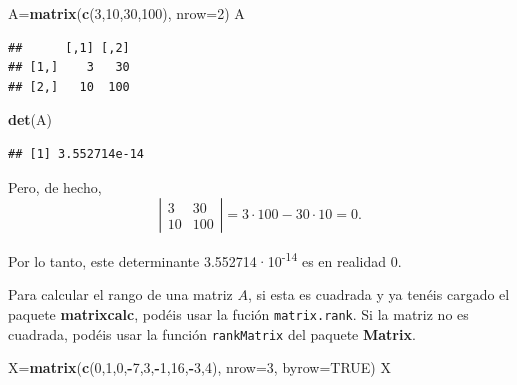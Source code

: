\documentclass[]{book}
\newenvironment{Shaded}{\begin{snugshade}}{\end{snugshade}}
\newcommand{\DataTypeTok}[1]{\textcolor[rgb]{0.13,0.29,0.53}{#1}}
\newcommand{\DecValTok}[1]{\textcolor[rgb]{0.00,0.00,0.81}{#1}}
\newcommand{\KeywordTok}[1]{\textcolor[rgb]{0.13,0.29,0.53}{\textbf{#1}}}
\newcommand{\NormalTok}[1]{#1}
\newcommand{\OperatorTok}[1]{\textcolor[rgb]{0.81,0.36,0.00}{\textbf{#1}}}
\newcommand{\OtherTok}[1]{\textcolor[rgb]{0.56,0.35,0.01}{#1}}
\theoremstyle{definition}
\theoremstyle{definition}
\theoremstyle{definition}
\theoremstyle{remark}
\begin{document}
\begin{Shaded}
\begin{Highlighting}[]
\NormalTok{A=}\KeywordTok{matrix}\NormalTok{(}\KeywordTok{c}\NormalTok{(}\DecValTok{3}\NormalTok{,}\DecValTok{10}\NormalTok{,}\DecValTok{30}\NormalTok{,}\DecValTok{100}\NormalTok{), }\DataTypeTok{nrow=}\DecValTok{2}\NormalTok{)}
\NormalTok{A}
\end{Highlighting}
\end{Shaded}

\begin{verbatim}
##      [,1] [,2]
## [1,]    3   30
## [2,]   10  100
\end{verbatim}

\begin{Shaded}
\begin{Highlighting}[]
\KeywordTok{det}\NormalTok{(A)}
\end{Highlighting}
\end{Shaded}

\begin{verbatim}
## [1] 3.552714e-14
\end{verbatim}

Pero, de hecho,
\[
\left|\begin{array}{cc}
3 & 30\\ 10 &100
\end{array}\right|=
3\cdot 100-30\cdot 10=0.
\]

Por lo tanto, este determinante 3.552714·10\textsuperscript{-14} es en realidad 0.

Para calcular el rango de una matriz \(A\), si esta es cuadrada y ya tenéis cargado el paquete \textbf{matrixcalc}, podéis usar la fución \texttt{matrix.rank}. Si la matriz no es cuadrada, podéis usar la función \texttt{rankMatrix} del paquete \textbf{Matrix}.

\begin{Shaded}
\begin{Highlighting}[]
\NormalTok{X=}\KeywordTok{matrix}\NormalTok{(}\KeywordTok{c}\NormalTok{(}\DecValTok{0}\NormalTok{,}\DecValTok{1}\NormalTok{,}\DecValTok{0}\NormalTok{,}\OperatorTok{-}\DecValTok{7}\NormalTok{,}\DecValTok{3}\NormalTok{,}\OperatorTok{-}\DecValTok{1}\NormalTok{,}\DecValTok{16}\NormalTok{,}\OperatorTok{-}\DecValTok{3}\NormalTok{,}\DecValTok{4}\NormalTok{), }\DataTypeTok{nrow=}\DecValTok{3}\NormalTok{, }\DataTypeTok{byrow=}\OtherTok{TRUE}\NormalTok{)}
\NormalTok{X}
\end{Highlighting}
\end{Shaded}
\end{document}
